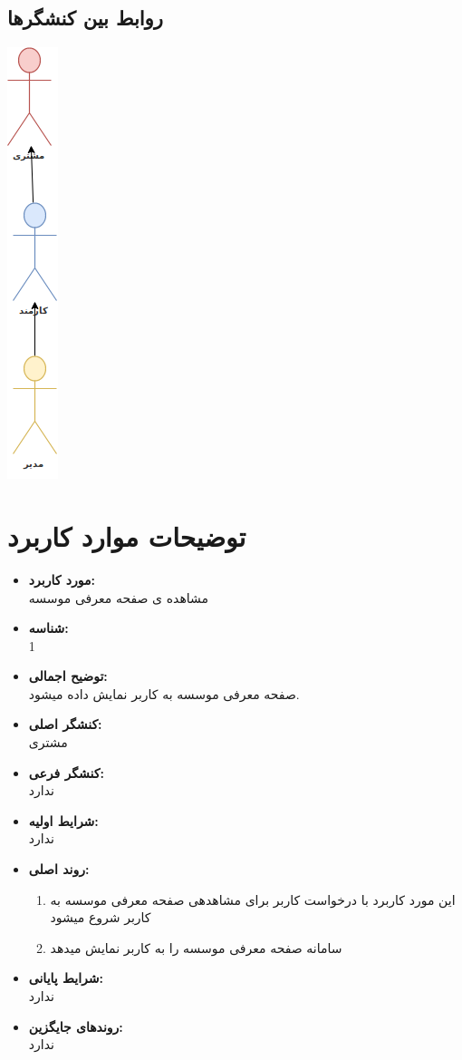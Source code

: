 \documentclass{article}
\begin{document}
\subsection{روابط بین کنشگرها}
\begin{center}
\includegraphics[scale=0.5]{./Diagrams/actors.png}
\end{center}
\section{توضیحات موارد کاربرد}
\begin{itemize}
\item \textbf{مورد کاربرد:}\\
مشاهده ی صفحه معرفی موسسه
\item \textbf{شناسه:}\\
1
\item \textbf{توضیح اجمالی:}\\
صفحه معرفی موسسه به کاربر نمایش داده میشود. 
\item \textbf{کنشگر اصلی:}\\
مشتری
\item \textbf{کنشگر فرعی:}\\
ندارد
\item \textbf{شرایط اولیه:}\\
ندارد
\item \textbf{روند اصلی:}\\
\begin{enumerate}
\item  این مورد کاربرد با درخواست کاربر برای مشاهدهی صفحه معرفی موسسه به کاربر شروع میشود
\item سامانه صفحه معرفی موسسه را به کاربر نمایش میدهد
\end{enumerate}
\item \textbf{شرایط پایانی:}\\ 
ندارد
\item \textbf{روندهای جایگزین:}\\
ندارد
\end{itemize}
\noindent\makebox[\linewidth]{\rule{\paperwidth}{0.4pt}}
\end{document}
